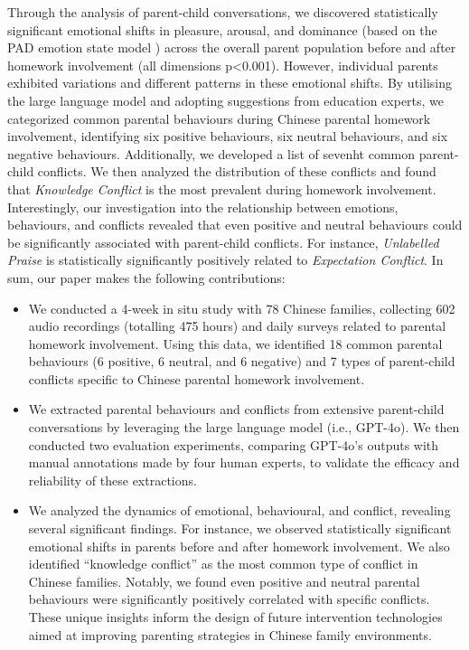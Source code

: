 Through the analysis of parent-child conversations, we discovered statistically significant emotional shifts in pleasure, arousal, and dominance (based on the PAD emotion state model \cite{bradley1994measuring}) across the overall parent population before and after homework involvement (all dimensions p<0.001). However, individual parents exhibited variations and different patterns in these emotional shifts. By utilising the large language model and adopting suggestions from education experts, we categorized common parental behaviours during Chinese parental homework involvement, identifying six positive behaviours, six neutral behaviours, and six negative behaviours. Additionally, we developed a list of sevenht common parent-child conflicts. We then analyzed the distribution of these conflicts and found that \textit{Knowledge Conflict} is the most prevalent during homework involvement. Interestingly, our investigation into the relationship between emotions, behaviours, and conflicts revealed that even positive and neutral behaviours could be significantly associated with parent-child conflicts. For instance, \textit{Unlabelled Praise} is statistically significantly positively related to \textit{Expectation Conflict}. In sum, our paper makes the following contributions:


\begin{itemize}
    \item We conducted a 4-week in situ study with 78 Chinese families, collecting 602 audio recordings (totalling 475 hours) and daily surveys related to parental homework involvement. Using this data, we identified 18 common parental behaviours (6 positive, 6 neutral, and 6 negative) and 7 types of parent-child conflicts specific to Chinese parental homework involvement.

    \item We extracted parental behaviours and conflicts from extensive parent-child conversations by leveraging the large language model (i.e., GPT-4o). We then conducted two evaluation experiments, comparing GPT-4o's outputs with manual annotations made by four human experts, to validate the efficacy and reliability of these extractions. 

    \item We analyzed the dynamics of emotional, behavioural, and conflict, revealing several significant findings. For instance, we observed statistically significant emotional shifts in parents before and after homework involvement. We also identified ``knowledge conflict'' as the most common type of conflict in Chinese families. Notably, we found even positive and neutral parental behaviours were significantly positively correlated with specific conflicts. These unique insights inform the design of future intervention technologies aimed at improving parenting strategies in Chinese family environments.

\end{itemize}

